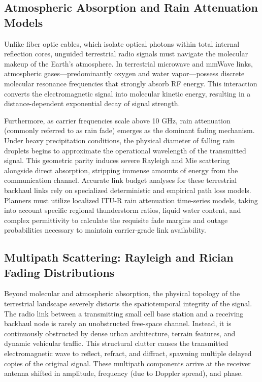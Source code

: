 \documentclass[11pt,a4paper]{article}
\begin{document}
\subsection{Atmospheric Absorption and Rain Attenuation Models}

Unlike fiber optic cables, which isolate optical photons within total internal reflection cores, unguided terrestrial radio signals must navigate the molecular makeup of the Earth's atmosphere.\cite{ref10} In terrestrial microwave and mmWave links, atmospheric gases---predominantly oxygen and water vapor---possess discrete molecular resonance frequencies that strongly absorb RF energy.\cite{ref12} This interaction converts the electromagnetic signal into molecular kinetic energy, resulting in a distance-dependent exponential decay of signal strength.\cite{ref10}

Furthermore, as carrier frequencies scale above 10 GHz, rain attenuation (commonly referred to as rain fade) emerges as the dominant fading mechanism.\cite{ref2} Under heavy precipitation conditions, the physical diameter of falling rain droplets begins to approximate the operational wavelength of the transmitted signal.\cite{ref12} This geometric parity induces severe Rayleigh and Mie scattering alongside direct absorption, stripping immense amounts of energy from the communication channel.\cite{ref6} Accurate link budget analyses for these terrestrial backhaul links rely on specialized deterministic and empirical path loss models.\cite{ref16} Planners must utilize localized ITU-R rain attenuation time-series models, taking into account specific regional thunderstorm ratios, liquid water content, and complex permittivity to calculate the requisite fade margins and outage probabilities necessary to maintain carrier-grade link availability.\cite{ref16}

\subsection{Multipath Scattering: Rayleigh and Rician Fading Distributions}

Beyond molecular and atmospheric absorption, the physical topology of the terrestrial landscape severely distorts the spatiotemporal integrity of the signal. The radio link between a transmitting small cell base station and a receiving backhaul node is rarely an unobstructed free-space channel.\cite{ref19} Instead, it is continuously obstructed by dense urban architecture, terrain features, and dynamic vehicular traffic.\cite{ref19} This structural clutter causes the transmitted electromagnetic wave to reflect, refract, and diffract, spawning multiple delayed copies of the original signal.\cite{ref10} These multipath components arrive at the receiver antenna shifted in amplitude, frequency (due to Doppler spread), and phase.\cite{ref23}
\end{document}
